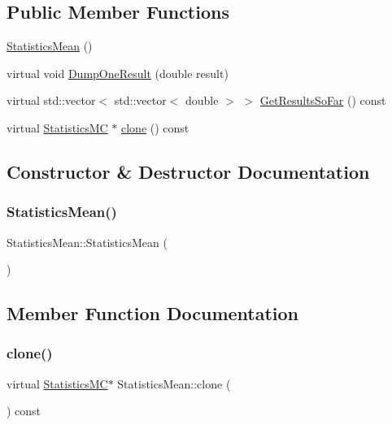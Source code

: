 \subsection*{Public Member Functions}
\begin{DoxyCompactItemize}
\item 
\hyperlink{classStatisticsMean_aec00084db178b9521efca3adcc463dd0}{Statistics\+Mean} ()
\item 
virtual void \hyperlink{classStatisticsMean_a4e57d592c77b52e1d8b3985ab221c33c}{Dump\+One\+Result} (double result)
\item 
virtual std\+::vector$<$ std\+::vector$<$ double $>$ $>$ \hyperlink{classStatisticsMean_acc9e8c9d9bfa37917845c45ef266b287}{Get\+Results\+So\+Far} () const
\item 
virtual \hyperlink{classStatisticsMC}{Statistics\+MC} $\ast$ \hyperlink{classStatisticsMean_a2ef95157e57b138a50c7c6d451a366e3}{clone} () const
\end{DoxyCompactItemize}


\subsection{Constructor \& Destructor Documentation}
\hypertarget{classStatisticsMean_aec00084db178b9521efca3adcc463dd0}{}\label{classStatisticsMean_aec00084db178b9521efca3adcc463dd0} 
\subsubsection{\texorpdfstring{Statistics\+Mean()}{StatisticsMean()}}
{\footnotesize\ttfamily Statistics\+Mean\+::\+Statistics\+Mean (\begin{DoxyParamCaption}{ }\end{DoxyParamCaption})}



\subsection{Member Function Documentation}
\hypertarget{classStatisticsMean_a2ef95157e57b138a50c7c6d451a366e3}{}\label{classStatisticsMean_a2ef95157e57b138a50c7c6d451a366e3} 
\subsubsection{\texorpdfstring{clone()}{clone()}}
{\footnotesize\ttfamily virtual \hyperlink{classStatisticsMC}{Statistics\+MC}$\ast$ Statistics\+Mean\+::clone (\begin{DoxyParamCaption}{ }\end{DoxyParamCaption}) const\hspace{0.3cm}{\ttfamily [virtual]}}



